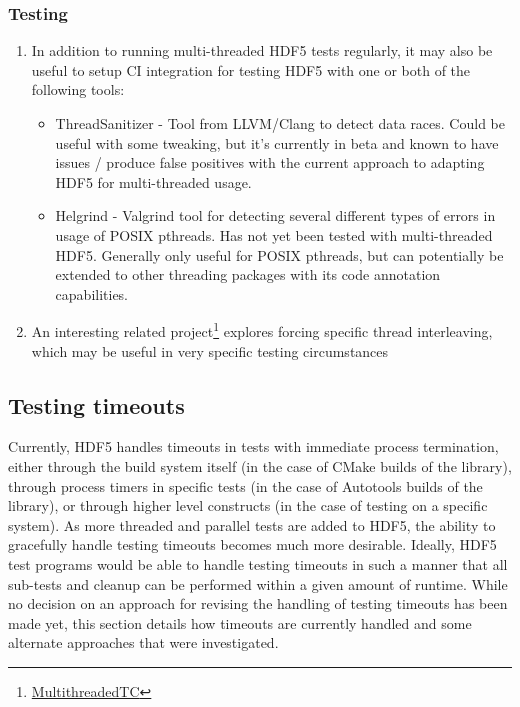 \documentclass[../HDF5_RFC.tex]{subfiles}
\begin{document}
\subsubsection{Testing}

\begin{enumerate}

    \item In addition to running multi-threaded HDF5 tests regularly, it may also be useful to setup CI
          integration for testing HDF5 with one or both of the following tools:

          \begin{itemize}

              \item ThreadSanitizer - Tool from LLVM/Clang to detect data races. Could be useful with
                    some tweaking, but it's currently in beta and known to have issues / produce false
                    positives with the current approach to adapting HDF5 for multi-threaded usage.

              \item Helgrind - Valgrind tool for detecting several different types of errors in usage
                    of POSIX pthreads. Has not yet been tested with multi-threaded HDF5. Generally only
                    useful for POSIX pthreads, but can potentially be extended to other threading packages
                    with its code annotation capabilities.

          \end{itemize}

    \item An interesting related project\footnote{\href{http://www.cs.umd.edu/projects/PL/multithreadedtc/overview.html}{MultithreadedTC}} explores forcing specific thread interleaving, which may be useful in very specific testing circumstances

\end{enumerate}

\subsection{Testing timeouts}
\label{sec:testing_timeouts}

Currently, HDF5 handles timeouts in tests with immediate process termination, either through the
build system itself (in the case of CMake builds of the library), through process timers in
specific tests (in the case of Autotools builds of the library), or through higher level constructs
(in the case of testing on a specific system). As more threaded and parallel tests are added to HDF5,
the ability to gracefully handle testing timeouts becomes much more desirable. Ideally, HDF5 test
programs would be able to handle testing timeouts in such a manner that all sub-tests and cleanup
can be performed within a given amount of runtime. While no decision on an approach for revising
the handling of testing timeouts has been made yet, this section details how timeouts are currently
handled and some alternate approaches that were investigated.
\end{document}
